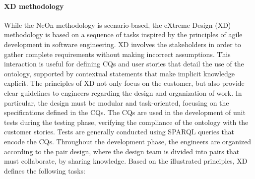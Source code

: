\paragraph{XD methodology}
While the NeOn methodology is scenario-based, the eXtreme Design (XD) methodology \cite{presutti2009extreme} is based on a sequence of tasks inspired by the principles of agile development in software engineering.
XD involves the stakeholders in order to gather complete requirements without making incorrect assumptions.
This interaction is useful for defining CQs and user stories that detail the use of the ontology, supported by contextual statements that make implicit knowledge explicit.
The principles of XD not only focus on the customer, but also provide clear guidelines to engineers regarding the design and organization of work.
In particular, the design must be modular and task-oriented, focusing on the specifications defined in the CQs.
The CQs are used in the development of unit tests during the testing phase, verifying the compliance of the ontology with the customer stories.
Tests are generally conducted using SPARQL queries that encode the CQs.
Throughout the development phase, the engineers are organized according to the pair design, where the design team is divided into pairs that must collaborate, by sharing knowledge.
Based on the illustrated principles, XD defines the following tasks: 
